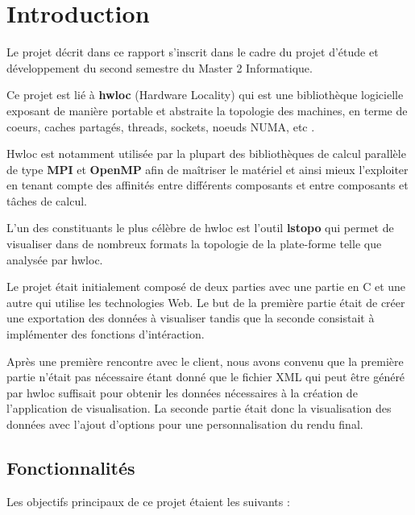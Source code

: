 \documentclass [a4paper,11pt]{article}
\begin{document}
\section{Introduction}
Le projet décrit dans ce rapport s'inscrit dans le cadre du projet d'étude et développement du second semestre du Master 2 Informatique.
\newline

Ce projet est lié à \textbf{hwloc} (Hardware Locality) qui est une bibliothèque logicielle exposant de manière portable et abstraite la topologie des machines, en terme de coeurs, caches partagés, threads, sockets, noeuds NUMA, etc \cite{lstopo}.
\newline

Hwloc est notamment utilisée par la plupart des bibliothèques de calcul parallèle de type \textbf{MPI} et \textbf{OpenMP} afin de maîtriser le matériel et ainsi mieux l'exploiter en tenant compte des affinités entre différents composants et entre composants et tâches de calcul.
\newline

L'un des constituants le plus célèbre de hwloc est l'outil \textbf{lstopo} qui permet de visualiser dans de nombreux formats la topologie de la plate-forme telle que analysée par hwloc.
\newline

Le projet était initialement composé de deux parties avec une partie en C et une autre qui utilise les technologies Web. Le but de la première partie était de créer une exportation des données à visualiser tandis que la seconde consistait à implémenter des fonctions d'intéraction.
\newline

Après une première rencontre avec le client, nous avons convenu que la première partie n'était pas nécessaire étant donné que le fichier XML qui peut être généré par hwloc suffisait pour obtenir les données nécessaires à la création de l'application de visualisation. La seconde partie était donc la visualisation des données avec l'ajout d'options pour une personnalisation du rendu final.

\newpage

\subsection{Fonctionnalités}

Les objectifs principaux de ce projet étaient les suivants : \newline
\end{document}
